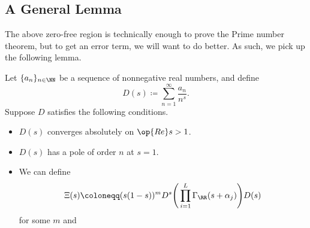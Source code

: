 \documentclass[../notes.tex]{subfiles}
\begin{document}
\subsection{A General Lemma}
The above zero-free region is technically enough to prove the Prime number theorem, but to get an error term, we will want to do better. As such, we pick up the following lemma.
\begin{lemma}
	Let $\{a_n\}_{n\in\NN}$ be a sequence of nonnegative real numbers, and define
	\[D(s)\coloneqq\sum_{n=1}^\infty\frac{a_n}{n^s}.\]
	Suppose $D$ satisfies the following conditions.
	\begin{itemize}
		\item $D(s)$ converges absolutely on $\op{Re}s>1$.
		\item $D(s)$ has a pole of order $n$ at $s=1$.
		\item We can define
		\[\Xi(s)\coloneqq(s(1-s))^mD^s\Bigg(\prod_{i=1}^L\Gamma_\RR(s+\alpha_j)\Bigg)D(s)\]
		for some $m$ and 
	\end{itemize}
\end{lemma}
\end{document}

